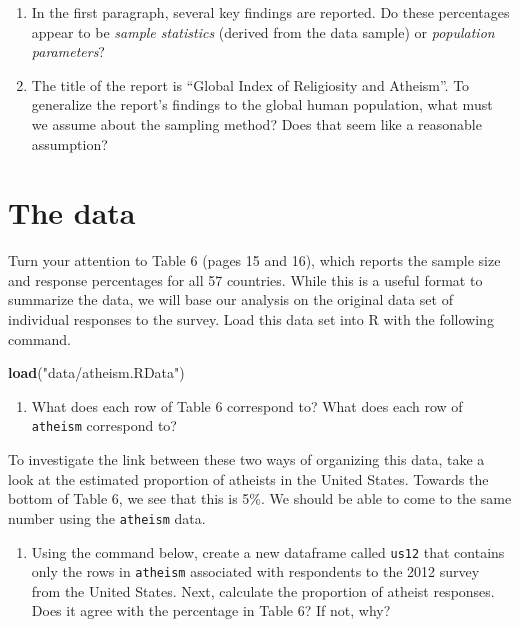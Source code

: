 \documentclass[]{book}
\newenvironment{Shaded}{\begin{snugshade}}{\end{snugshade}}
\newcommand{\KeywordTok}[1]{\textcolor[rgb]{0.13,0.29,0.53}{\textbf{{#1}}}}
\newcommand{\StringTok}[1]{\textcolor[rgb]{0.31,0.60,0.02}{{#1}}}
\newcommand{\NormalTok}[1]{{#1}}
\providecommand{\tightlist}{%
  \setlength{\itemsep}{0pt}\setlength{\parskip}{0pt}}
\theoremstyle{definition}
\theoremstyle{definition}
\theoremstyle{remark}
\begin{document}
\begin{enumerate}
\def\labelenumi{\arabic{enumi}.}
\item
  In the first paragraph, several key findings are reported. Do these
  percentages appear to be \emph{sample statistics} (derived from the
  data sample) or \emph{population parameters}?
\item
  The title of the report is ``Global Index of Religiosity and
  Atheism''. To generalize the report's findings to the global human
  population, what must we assume about the sampling method? Does that
  seem like a reasonable assumption?
\end{enumerate}

\section*{The data}\label{the-data-3}

Turn your attention to Table 6 (pages 15 and 16), which reports the
sample size and response percentages for all 57 countries. While this is
a useful format to summarize the data, we will base our analysis on the
original data set of individual responses to the survey. Load this data
set into R with the following command.

\begin{Shaded}
\begin{Highlighting}[]
\KeywordTok{load}\NormalTok{(}\StringTok{"data/atheism.RData"}\NormalTok{)}
\end{Highlighting}
\end{Shaded}

\begin{enumerate}
\def\labelenumi{\arabic{enumi}.}
\setcounter{enumi}{2}
\tightlist
\item
  What does each row of Table 6 correspond to? What does each row of
  \texttt{atheism} correspond to?
\end{enumerate}

To investigate the link between these two ways of organizing this data,
take a look at the estimated proportion of atheists in the United
States. Towards the bottom of Table 6, we see that this is 5\%. We
should be able to come to the same number using the \texttt{atheism}
data.

\begin{enumerate}
\def\labelenumi{\arabic{enumi}.}
\setcounter{enumi}{3}
\tightlist
\item
  Using the command below, create a new dataframe called \texttt{us12}
  that contains only the rows in \texttt{atheism} associated with
  respondents to the 2012 survey from the United States. Next, calculate
  the proportion of atheist responses. Does it agree with the percentage
  in Table 6? If not, why?
\end{enumerate}
\end{document}

